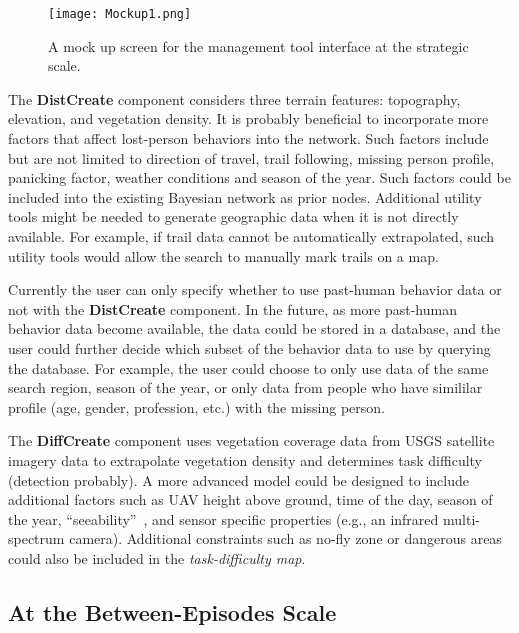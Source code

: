 \begin{figure}
\centering
\texttt{[image: Mockup1.png]}
\caption{A mock up screen for the management tool interface at the strategic scale.}
\label{Mockup1}
\end{figure}

The \textbf{DistCreate} component considers three terrain features: topography, elevation, and vegetation density. It is probably beneficial to incorporate more factors that affect lost-person behaviors into the network. Such factors include but are not limited to direction of travel, trail following, missing person profile, panicking factor, weather conditions and season of the year. Such factors could be included into the existing Bayesian network as prior nodes. Additional utility tools might be needed to generate geographic data when it is not directly available. For example, if trail data cannot be automatically extrapolated, such utility tools would allow the search to manually mark trails on a map.

Currently the user can only specify whether to use past-human behavior data or not with the \textbf{DistCreate} component. In the future, as more past-human behavior data become available, the data could be stored in a database, and the user could further decide which subset of the behavior data to use by querying the database. For example, the user could choose to only use data of the same search region, season of the year, or only data from people who have simililar profile (age, gender, profession, etc.) with the missing person.

The \textbf{DiffCreate} component uses vegetation coverage data from USGS satellite imagery data to extrapolate vegetation density and determines task difficulty (detection probably). A more advanced model could be designed to include additional factors such as UAV height above ground, time of the day, season of the year, ``seeability''~\cite{Morse2010UAV}, and sensor specific properties (e.g., an infrared multi-spectrum camera). Additional constraints such as no-fly zone or dangerous areas could also be included in the \textit{task-difficulty map}.

\subsection{At the Between-Episodes Scale}

